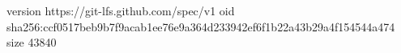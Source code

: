 version https://git-lfs.github.com/spec/v1
oid sha256:ccf0517beb9b7f9acab1ee76e9a364d233942ef6f1b22a43b29a4f154544a474
size 43840
